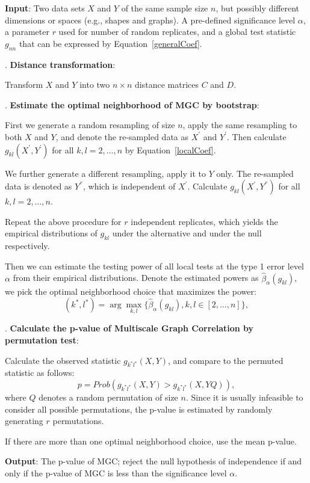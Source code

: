\documentclass[11pt]{article}
\begin{document}
\begin{algorithm}
\label{alg1}
\begin{algorithmic} 
\State \textbf{Input}: Two data sets $X$ and $Y$ of the same sample size $n$, but possibly different dimensions or spaces (e.g., shapes and graphs). A pre-defined significance level $\alpha$, a parameter $r$ used for number of random replicates, and a global test statistic $g_{nn}$ that can be expressed by Equation~\ref{generalCoef}. 

. \textbf{Distance transformation}:

Transform $X$ and $Y$ into two $n \times n$ distance matrices $C$ and $D$. 

. \textbf{Estimate the optimal neighborhood of MGC by bootstrap}:

First we generate a random resampling of size $n$, apply the same resampling to both $X$ and $Y$, and denote the re-sampled data as $X^{'}$ and $Y^{'}$. Then calculate $g_{kl}(X^{'}, Y^{'})$ for all $k,l=2,\ldots,n$ by Equation~\eqref{localCoef}. 

We further generate a different resampling, apply it to $Y$ only. The re-sampled data is denoted as $Y^{''}$, which is independent of $X^{'}$. Calculate $g_{kl}(X^{'}, Y^{''})$ for all $k,l=2,\ldots,n$. 

Repeat the above procedure for $r$ independent replicates, which yields the empirical distributions of $g_{kl}$ under the alternative and under the null respectively. 

Then we can estimate the testing power of all local tests at the type 1 error level $\alpha$ from their empirical distributions. Denote the estimated powers as $\hat{\beta}_{\alpha}(g_{kl})$, we pick the optimal neighborhood choice that maximizes the power:
\begin{equation}
\label{power}
(k^{*},l^{*})=\arg\max_{k,l}\{\hat{\beta}_{\alpha}(g_{kl}), k,l\in [2,\ldots,n]\},
\end{equation}

. \textbf{Calculate the p-value of Multiscale Graph Correlation by permutation test}: 

Calculate the observed statistic $g_{k^{*}l^{*}}(X, Y)$, and compare to the permuted statistic as follows:
\begin{equation}
\label{pvalue}
p=Prob(g_{k^{*}l^{*}}(X, Y)>g_{k^{*}l^{*}}(X, YQ)),
\end{equation}
where $Q$ denotes a random permutation of size $n$. Since it is usually infeasible to consider all possible permutations, the p-value is estimated by randomly generating $r$ permutations.

If there are more than one optimal neighborhood choice, use the mean p-value.

\State \textbf{Output}: The p-value of MGC; reject the null hypothesis of independence if and only if the p-value of MGC is less than the significance level $\alpha$.
\end{algorithmic} 
\end{algorithm} 
\end{document}
